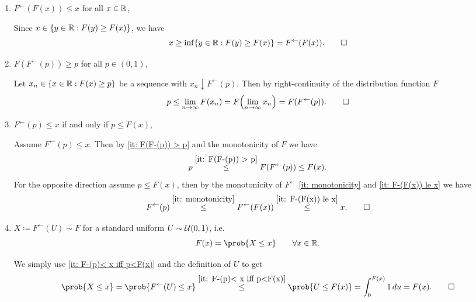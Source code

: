 \begin{exercise}
\begin{enumerate}[label=(\alph*), noitemsep]
        \item\label{it: F-(F(x)) le x} \(F^{\leftarrow}(F(x)) \le x\) for all \(x \in \mathbb{R}\),
        \begin{solution}
            Since \(x\in \{y\in \mathbb{R} : F(y) \ge F(x)\}\), we have
            \[
                x \ge \inf\{y\in \mathbb{R} : F(y) \ge F(x)\} = F^{\leftarrow}(F(x)).
                \qedhere
            \]
        \end{solution}

        \item\label{it: F(F-(p)) > p} \(F(F^{\leftarrow}(p)) \ge p\) for all \(p \in (0,1)\),
        \begin{solution}
            Let \(x_n \in \{x\in \mathbb{R} : F(x) \ge p\}\) be a sequence with \(x_n \downarrow F^{\leftarrow}(p)\). Then
            by right-continuity of the distribution function \(F\)
            \[
                p \le \lim_{n\to \infty} F(x_n)
                = F\Bigl(\lim_{n\to \infty} x_n\Bigr)
                = F(F^{\leftarrow}(p)).
                \qedhere
            \]
        \end{solution}

        \item\label{it: F-(p)< x iff p<F(x)} \(F^{\leftarrow}(p) \le x\) if and only if \(p \le F(x)\),
        \begin{solution}
            Assume \(F^{\leftarrow}(p) \le x\). Then by \ref{it: F(F-(p)) > p} 
            and the monotonicity of \(F\) we have
            \[
                p \overset{\ref{it: F(F-(p)) > p}}\le F(F^{\leftarrow}(p)) \le F(x).
            \]
            For the opposite direction assume \(p\le F(x)\), then by the
            monotonicity of \(F^{\leftarrow}\) \ref{it: monotonicity}
            and \ref{it: F-(F(x)) le x} we have
            \[
                F^{\leftarrow}(p) \overset{\ref{it: monotonicity}}\le F^{\leftarrow}(F(x)) \overset{\ref{it: F-(F(x)) le x}}\le x.
                \qedhere
            \]
        \end{solution}

        \item\label{it: inverse transform sampling}
        \(X\coloneq F^{\leftarrow}(U) \sim F\) for a standard uniform \(U\sim \mathcal{U}(0,1)\), i.e.\ 
        \[
            F(x) = \prob{X \le x}
            \qquad \forall x \in \real.
        \]
        \begin{solution}
            We simply use \ref{it: F-(p)< x iff p<F(x)} and the definition of \(U\) to get
            \[
                \prob{X \le x}
                = \prob{F^{\leftarrow}(U) \le x}
                \overset{\ref{it: F-(p)< x iff p<F(x)}}\le \prob{U \le F(x)}
                = \int_0^{F(x)} 1 \, du
                = F(x).
                \qedhere
            \]
        \end{solution}


\end{enumerate}
\end{exercise}
